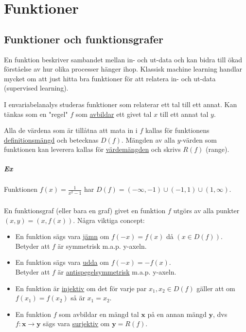\chapter{Funktioner}
\section{Funktioner och funktionsgrafer}
En funktion beskriver sambandet mellan in- och ut-data och kan bidra till ökad förståelse av hur olika processer hänger ihop.
Klassisk machine learning handlar mycket om att just hitta bra funktioner för att relatera in- och ut-data (supervised learning).

I envariabelanalys studeras funktioner som relaterar ett tal till ett annat.
Kan tänkas som en "regel" $f$ som \underline{avbildar} ett givet tal $x$ till ett annat tal $y$.

Alla de värdena som är tillåtna att mata in i $f$ kallas för funktionens \underline{definitionsmängd} och betecknas $D(f)$.
Mängden av alla $y$-värden som funktionen kan leverera kallas för \underline{värdemängden} och skrivs $R(f)$ (range).

\paragraph{Ex} Funktionen $f(x)=\frac{1}{x^2-1}$ har $D(f)=(-\infty,-1)\cup(-1,1)\cup(1,\infty)$.

\paragraph{} En funktionsgraf (eller bara en graf) givet en funktion $f$ utgörs av alla punkter $(x,y)=(x,f(x))$.
Några viktiga concept:
\begin{itemize}
    \item En funktion sägs vara \underline{jämn} om $f(-x)=f(x)$ då $(x\in D(f))$.\\
          Betyder att $f$ är symmetrisk m.a.p. y-axeln.
    \item En funktion sägs vara \underline{udda} om $f(-x)=-f(x)$.\\
          Betyder att $f$ är \underline{antispegelsymmetrisk} m.a.p. y-axeln.
    \item En funktion är \underline{injektiv} om det för varje par $x_1,x_2\in D(f)$ gäller att om $f(x_1)=f(x_2)$ så är $x_1=x_2$.
    \item En funktion $f$ som avbildar en mängd tal $\bm{x}$ på en annan mängd $\bm{y}$, dvs $f:\bm{x}\rightarrow\bm{y}$ sägs vara \underline{surjektiv} om $\bm{y}=R(f)$.
\end{itemize}

